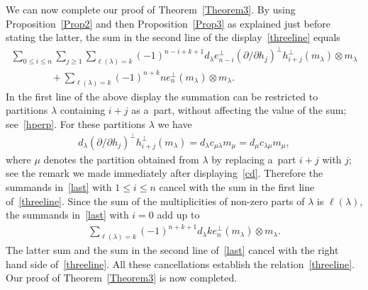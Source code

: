 \documentclass[11pt]{article}
\numberwithin{equation}{section}
\renewcommand\ge{\geqslant}
\renewcommand\le{\leqslant}
\begin{document}
We can now complete our proof of Theorem~\ref{Theorem3}.
By using Proposition~\ref{Prop2} and then Proposition~\ref{Prop3}
as explained just before stating the latter, the sum in the
second line of the display~\eqref{threeline} equals
\begin{gather}
\sum_{0\le i\le n}\sum_{j\ge1}\sum_{\ell(\lambda)=k}(-1)^{n-i+k+1}
d_\lambda e_{n-i}^{\perp}(\partial /\partial h_j)^{\perp}h_{i+j}^{\perp}(m_\lambda)\otimes m_\lambda
\nonumber
\\
\qquad\qquad
{}+\sum_{\ell(\lambda)=k}(-1)^{n+k}ne_n^{\perp}(m_\lambda)\otimes m_\lambda.
\label{last}
\end{gather}
In  the f\/irst line of the above display the summation can be restricted to partitions $\lambda$ containing
$i+j$ as a~part, without af\/fecting the value of the sum; see~\eqref{hperp}.
For these partitions $\lambda$ we have
\begin{gather*}
d_\lambda(\partial /\partial h_j)^{\perp}
h_{i+j}^{\perp}(m_\lambda)=d_\lambda c_{\mu\lambda}m_\mu=d_\mu c_{\lambda\mu}m_\mu,
\end{gather*}
where $\mu$ denotes the partition obtained from $\lambda$ by replacing a~part $i+j$ with $j$; see the
remark we made immediately after displaying~\eqref{cd}.
Therefore the summands in~\eqref{last} with $1\le i\le n$ cancel with the sum in the f\/irst line
of~\eqref{threeline}.
Since the sum of the multiplicities of non-zero parts of $\lambda$ is $\ell(\lambda)$, the summands
in~\eqref{last} with $i=0$ add up to
\begin{gather*}
\sum_{\ell(\lambda)=k}(-1)^{n+k+1}d_\lambda ke_n^{\perp}(m_\lambda)\otimes m_\lambda.
\end{gather*}
The  latter sum and the sum in the second line of~\eqref{last} cancel with the right hand side
of~\eqref{threeline}.
All these cancellations establish the relation~\eqref{threeline}.
Our proof of Theorem~\ref{Theorem3} is now completed.
\end{document}
